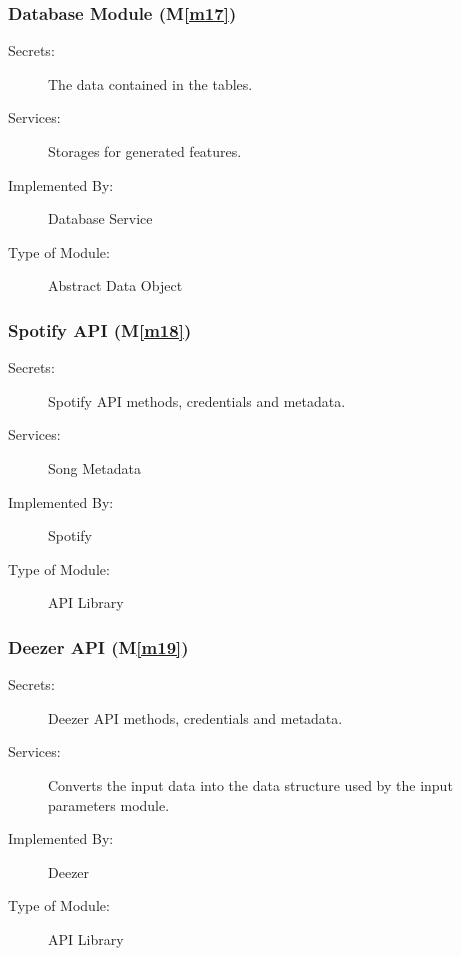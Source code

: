 \documentclass[12pt, titlepage]{article}
\newcommand{\mref}[1]{M\ref{#1}}
\begin{document}
\subsubsection{Database Module (\mref{m17})}

\begin{description}
\item[Secrets:] The data contained in the tables. 
\item[Services:] Storages for generated features. 
\item[Implemented By:] Database Service
\item[Type of Module:] Abstract Data Object
\end{description}



\subsubsection{Spotify API (\mref{m18})}

\begin{description}
\item[Secrets:]Spotify API methods, credentials and metadata. 
\item[Services:]Song Metadata
\item[Implemented By:] Spotify
\item[Type of Module:] API Library
\end{description}

\subsubsection{Deezer API (\mref{m19})}

\begin{description}
\item[Secrets:]Deezer API methods, credentials and metadata. 
\item[Services:]Converts the input data into the data structure used by the
  input parameters module.
\item[Implemented By:] Deezer
\item[Type of Module:] API Library
\end{description}
\end{document}
